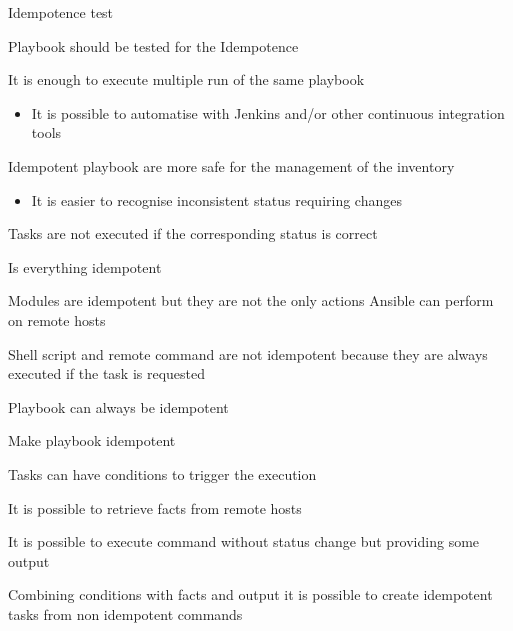 \documentclass[12pt, xcolor={dvipsnames}]{beamer}
\newenvironment{wideitemize}{\itemize\addtolength{\itemsep}{12pt}}{\enditemize}
\begin{document}
\begin{frame}[t]{Idempotence test}
  \begin{wideitemize}
    \item Playbook should be tested for the Idempotence
    \item It is enough to execute multiple run of the same playbook
    \begin{itemize}
      \item It is possible to automatise with Jenkins and/or other continuous integration tools
    \end{itemize}
    \item Idempotent playbook are more safe for the management of the inventory
    \begin{itemize}
      \item It is easier to recognise inconsistent status requiring changes
    \end{itemize}
    \item Tasks are not executed if the corresponding status is correct
  \end{wideitemize}
\end{frame}

\begin{frame}[t]{Is everything idempotent}
  \begin{wideitemize}
    \item Modules are idempotent but they are not the only actions Ansible can perform on remote hosts
    \item Shell script and remote command are not idempotent because they are always executed if the task is requested
    \item Playbook can always be idempotent
  \end{wideitemize}
\end{frame}

\begin{frame}[t]{Make playbook idempotent}
  \begin{wideitemize}
    \item Tasks can have conditions to trigger the execution
    \item It is possible to retrieve facts from remote hosts
    \item It is possible to execute command without status change but providing some output
    \item \alert{Combining conditions with facts and output it is possible to create idempotent tasks from non idempotent commands}
  \end{wideitemize}
\end{frame}
\end{document}
